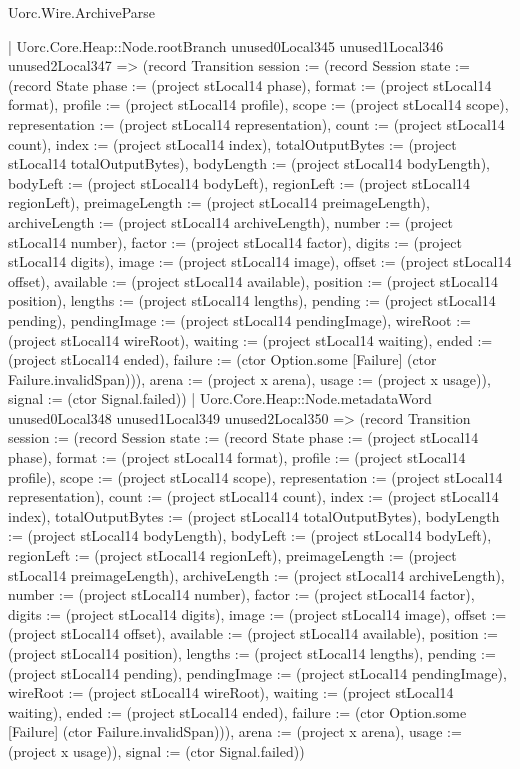 \begin{lexlean}{Uorc.Wire.ArchiveParse}
\begin{semanticmodule}
{            | Uorc.Core.Heap::Node.rootBranch unused0Local345 unused1Local346 unused2Local347 => (record Transition {session := (record Session {state := (record State {phase := (project stLocal14 phase), format := (project stLocal14 format), profile := (project stLocal14 profile), scope := (project stLocal14 scope), representation := (project stLocal14 representation), count := (project stLocal14 count), index := (project stLocal14 index), totalOutputBytes := (project stLocal14 totalOutputBytes), bodyLength := (project stLocal14 bodyLength), bodyLeft := (project stLocal14 bodyLeft), regionLeft := (project stLocal14 regionLeft), preimageLength := (project stLocal14 preimageLength), archiveLength := (project stLocal14 archiveLength), number := (project stLocal14 number), factor := (project stLocal14 factor), digits := (project stLocal14 digits), image := (project stLocal14 image), offset := (project stLocal14 offset), available := (project stLocal14 available), position := (project stLocal14 position), lengths := (project stLocal14 lengths), pending := (project stLocal14 pending), pendingImage := (project stLocal14 pendingImage), wireRoot := (project stLocal14 wireRoot), waiting := (project stLocal14 waiting), ended := (project stLocal14 ended), failure := (ctor Option.some [Failure] (ctor Failure.invalidSpan))}), arena := (project x arena), usage := (project x usage)}), signal := (ctor Signal.failed)})
            | Uorc.Core.Heap::Node.metadataWord unused0Local348 unused1Local349 unused2Local350 => (record Transition {session := (record Session {state := (record State {phase := (project stLocal14 phase), format := (project stLocal14 format), profile := (project stLocal14 profile), scope := (project stLocal14 scope), representation := (project stLocal14 representation), count := (project stLocal14 count), index := (project stLocal14 index), totalOutputBytes := (project stLocal14 totalOutputBytes), bodyLength := (project stLocal14 bodyLength), bodyLeft := (project stLocal14 bodyLeft), regionLeft := (project stLocal14 regionLeft), preimageLength := (project stLocal14 preimageLength), archiveLength := (project stLocal14 archiveLength), number := (project stLocal14 number), factor := (project stLocal14 factor), digits := (project stLocal14 digits), image := (project stLocal14 image), offset := (project stLocal14 offset), available := (project stLocal14 available), position := (project stLocal14 position), lengths := (project stLocal14 lengths), pending := (project stLocal14 pending), pendingImage := (project stLocal14 pendingImage), wireRoot := (project stLocal14 wireRoot), waiting := (project stLocal14 waiting), ended := (project stLocal14 ended), failure := (ctor Option.some [Failure] (ctor Failure.invalidSpan))}), arena := (project x arena), usage := (project x usage)}), signal := (ctor Signal.failed)})
}
\end{semanticmodule}
\end{lexlean}
